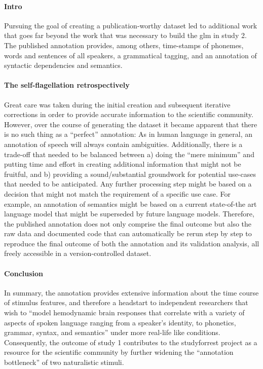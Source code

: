 \paragraph{Intro}

Pursuing the goal of creating a publication-worthy dataset led to additional
work that goes far beyond the work that was necessary to build the \ac{glm} in
study 2.
The published annotation provides, among others, time-stamps of phonemes, words
and sentences of all speakers, a grammatical tagging, and an annotation of
syntactic dependencies and semantics.


\paragraph{The self-flagellation retrospectively}
%
Great care was taken during the initial creation and subsequent iterative
corrections in order to provide accurate information to the scientific
community.
%
However, over the course of generating the dataset it became apparent that there
is no such thing as a ``perfect'' annotation:
%
As in human language in general, an annotation of speech will always contain
ambiguities.
%
Additionally, there is a trade-off that needed to be balanced between a) doing
the ``mere minimum'' and putting time and effort in creating additional
information that might not be fruitful, and b) providing a sound/substantial
groundwork for potential use-cases that needed to be anticipated.
%
Any further processing step might be based on a decision that might not match
the requirement of a specific use case.
%
For example, an annotation of semantics might be based on a current state-of-the
art language model that might be superseded by future language models.
%
Therefore, the published annotation does not only comprise the final outcome but
also the raw data and documented code that can automatically be rerun step by
step to reproduce the final outcome of both the annotation and its validation
analysis, all freely accessible in a version-controlled dataset.


\paragraph{Conclusion}
%
In summary, the annotation provides extensive information about the time course
of stimulus features, and therefore a headstart to independent researchers that
wish to ``model hemodynamic brain responses that correlate with a variety of
aspects of spoken language ranging from a speaker's identity, to phonetics,
grammar, syntax, and semantics'' \citep{haeusler2021speechanno} under more
real-life like conditions.
%
Consequently, the outcome of study 1 contributes to the studyforrest project as
a resource for the scientific community by further widening the ``annotation
bottleneck'' \citep{aliko2020naturalistic} of two naturalistic stimuli.


